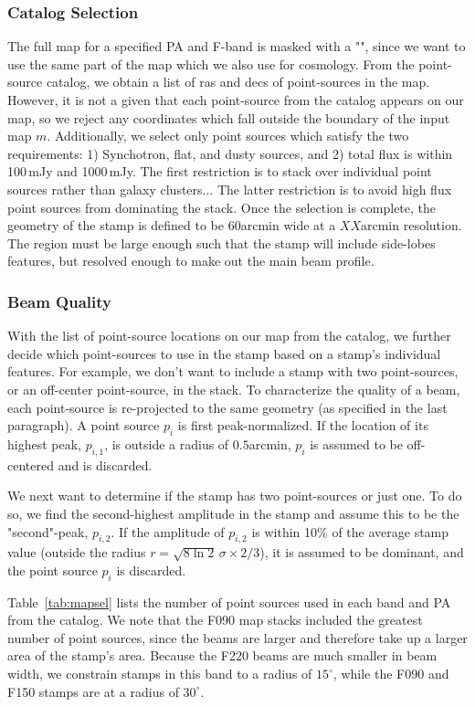 \subsubsection{Catalog Selection}
\label{subsec:cat_sel}
The full map for a specified PA and F-band is masked with a "", since we want to use the same part of the map which we also use for cosmology.  From the point-source catalog, we obtain a list of ras and decs of point-sources in the map.  However, it is not a given that each point-source from the catalog appears on our map, so we reject any coordinates which fall outside the boundary of the input map $m$.  Additionally, we select only point sources which satisfy the two requirements: 1) Synchotron, flat, and dusty sources, and 2) total flux is within 100\,mJy and 1000\,mJy.  The first restriction is to stack over individual point sources rather than galaxy clusters... The latter restriction is to avoid high flux point sources from dominating the stack.  Once the selection is complete, the geometry of the stamp is defined to be $60$arcmin wide at a $XX$arcmin resolution.  The region must be large enough such that the stamp will include side-lobes features, but resolved enough to make out the main beam profile.

\subsubsection{Beam Quality}
With the list of point-source locations on our map from the catalog, we further decide which point-sources to use in the stamp based on a stamp's individual features.  For example, we don't want to include a stamp with two point-sources, or an off-center point-source, in the stack.  To characterize the quality of a beam, each point-source is re-projected to the same geometry (as specified in the last paragraph).  A point source $p_i$ is first peak-normalized.  If the location of its highest peak, $p_{i,1}$, is outside a radius of $0.5$arcmin, $p_i$ is assumed to be off-centered and is discarded.  

We next want to determine if the stamp has two point-sources or just one.  To do so, we find the second-highest amplitude in the stamp and assume this to be the "second"-peak, $p_{i,2}$.  If the amplitude of $p_{i,2}$ is within 10\% of the average stamp value (outside the radius $r=\sqrt{8\ln{2}}\,\sigma\times 2/3$), it is assumed to be dominant, and the point source $p_i$ is discarded.

Table~\ref{tab:mapsel} lists the number of point sources used in each band and PA from the catalog.  We note that the F090 map stacks included the greatest number of point sources, since the beams are larger and therefore take up a larger area of the stamp's area.  Because the F220 beams are much smaller in beam width, we constrain stamps in this band to a radius of $15^{\circ}$, while the F090 and F150 stamps are at a radius of $30^{\circ}$.

